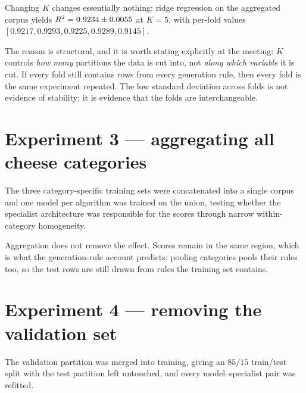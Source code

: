 \begin{findingbox}[title=Result of Experiment 2]
Changing $K$ changes essentially nothing: ridge regression on the
aggregated corpus yields $R^2 = 0.9234 \pm 0.0055$ at $K=5$, with per-fold
values $[0.9217, 0.9293, 0.9225, 0.9289, 0.9145]$.

The reason is structural, and it is worth stating explicitly at the
meeting: $K$ controls \emph{how many} partitions the data is cut into, not
\emph{along which variable} it is cut. If every fold still contains rows
from every generation rule, then every fold is the same experiment
repeated. The low standard deviation across folds is not evidence of
stability; it is evidence that the folds are interchangeable.
\end{findingbox}

\section{Experiment 3 --- aggregating all cheese categories}

The three category-specific training sets were concatenated into a single
corpus and one model per algorithm was trained on the union, testing
whether the specialist architecture was responsible for the scores through
narrow within-category homogeneity.


\begin{findingbox}[title=Result of Experiment 3]
Aggregation does not remove the effect. Scores remain in the same region,
which is what the generation-rule account predicts: pooling categories
pools their rules too, so the test rows are still drawn from rules the
training set contains.
\end{findingbox}

\section{Experiment 4 --- removing the validation set}

The validation partition was merged into training, giving an $85/15$
train/test split with the test partition left untouched, and every
model--specialist pair was refitted.


